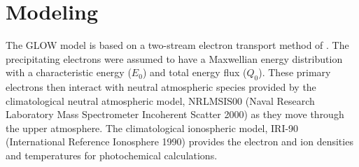 \documentclass[crop=false,class=mitthesis,oneside,font=12pt]{standalone}
\begin{document}
\section{Modeling} 
\label{sec:model}
The GLOW model is based on a two-stream electron transport method of \citet{nagybanks1970}. The precipitating electrons were assumed to have a Maxwellian energy distribution with a characteristic energy ($E_{0}$) and total energy flux ($Q_{0}$). These primary electrons then interact with neutral atmospheric species provided by the climatological neutral atmospheric model, NRLMSIS00 (Naval Research Laboratory Mass Spectrometer Incoherent Scatter 2000) \citep{msie} as they move through the upper atmosphere. The climatological ionospheric model, IRI-90 (International Reference Ionosphere 1990) \citep{iri} provides the electron and ion densities and temperatures for photochemical calculations.
\end{document}
